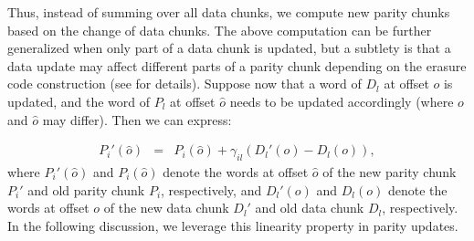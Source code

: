 Thus, instead of summing over all data chunks, we compute new parity chunks
based on the change of data chunks.  The above computation can be further 
generalized when only part of a data chunk is updated, but a subtlety is that 
a data update may affect different parts of a parity chunk depending on the
erasure code construction (see \cite{plank13} for details).  Suppose now that
a word of $D_l$ at offset $o$ is updated, and the word of $P_l$ at offset
$\hat{o}$ needs to be updated accordingly (where $o$ and $\hat{o}$ may
differ).  Then we can express:

\begin{eqnarray}
P_i'(\hat{o}) 
& = & P_i(\hat{o}) + \gamma_{il}(D_l'(o) - D_l(o)),\nonumber
\end{eqnarray}
where $P_i'(\hat{o})$ and $P_i(\hat{o})$ denote the words at offset $\hat{o}$
of the new parity chunk $P_i'$ and old parity chunk $P_i$, respectively, and 
$D_l'(o)$ and $D_l(o)$ denote the words at offset $o$ of the new data chunk
$D_l'$ and old data chunk $D_l$, respectively.  In the following discussion,
we leverage this linearity property in parity updates. 

